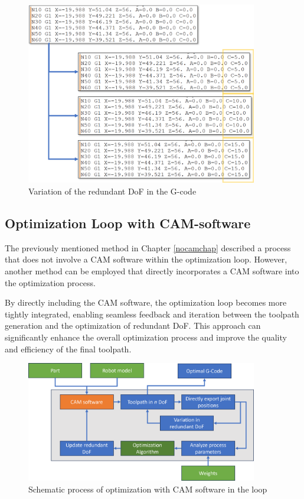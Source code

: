 \begin{figure}[H]
	\centerline{\includegraphics[width=0.9\textwidth]{figures/gcodevariation.png}}
	\caption{Variation of the redundant DoF in the G-code}
	\label{variation}
\end{figure}


\subsection{Optimization Loop with CAM-software}

The previously mentioned method in Chapter \ref{nocamchap} described a process that does not involve a CAM software within the optimization loop. However, another method can be employed that directly incorporates a CAM software into the optimization process.


By directly including the CAM software, the optimization loop becomes more tightly integrated, enabling seamless feedback and iteration between the toolpath generation and the optimization of redundant DoF. This approach can significantly enhance the overall optimization process and improve the quality and efficiency of the final toolpath.



 \begin{figure}[H]
 	\centerline{\includegraphics[width=0.9\textwidth]{figures/camloop.png}}
 	\caption{Schematic process of optimization with CAM software in the loop}
 	\label{camloop}
 \end{figure}

